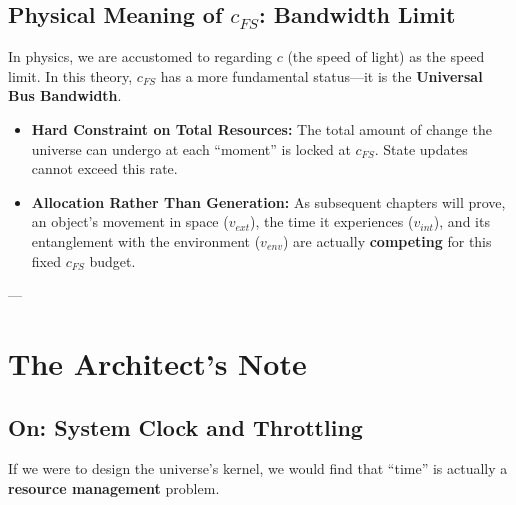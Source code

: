 \documentclass[11pt,a4paper,twoside]{book}
\begin{document}
\subsection{Physical Meaning of $c_{FS}$: Bandwidth Limit}

In physics, we are accustomed to regarding \textbf{$c$} (the speed of light) as the speed limit. In this theory, \textbf{$c_{FS}$} has a more fundamental status---it is the \textbf{Universal Bus Bandwidth}.

\begin{itemize}
\item \textbf{Hard Constraint on Total Resources:} The total amount of change the universe can undergo at each ``moment'' is locked at \textbf{$c_{FS}$}. State updates cannot exceed this rate.

\item \textbf{Allocation Rather Than Generation:} As subsequent chapters will prove, an object's movement in space (\textbf{$v_{ext}$}), the time it experiences (\textbf{$v_{int}$}), and its entanglement with the environment (\textbf{$v_{env}$}) are actually \textbf{competing} for this fixed \textbf{$c_{FS}$} budget.
\end{itemize}

---

\section{The Architect's Note}

\subsection{On: System Clock and Throttling}

If we were to design the universe's kernel, we would find that ``time'' is actually a \textbf{resource management} problem.
\end{document}
